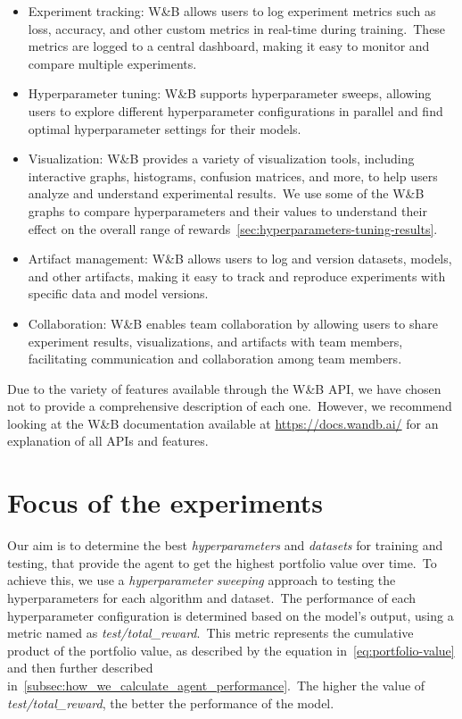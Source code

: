 \documentclass[../xlapes02]{subfiles}
\begin{document}
    \begin{itemize}
        \item Experiment tracking: W\&B allows users to log experiment metrics such as loss, accuracy, and other custom metrics in real-time during training.\ These metrics are logged to a central dashboard, making it easy to monitor and compare multiple experiments.
        \item Hyperparameter tuning: W\&B supports hyperparameter sweeps, allowing users to explore different hyperparameter configurations in parallel and find optimal hyperparameter settings for their models.
        \item Visualization: W\&B provides a variety of visualization tools, including interactive graphs, histograms, confusion matrices, and more, to help users analyze and understand experimental results.\ We use some of the W\&B graphs to compare hyperparameters and their values to understand their effect on the overall range of rewards~\cref{sec:hyperparameters-tuning-results}.
        \item Artifact management: W\&B allows users to log and version datasets, models, and other artifacts, making it easy to track and reproduce experiments with specific data and model versions.
        \item Collaboration: W\&B enables team collaboration by allowing users to share experiment results, visualizations, and artifacts with team members, facilitating communication and collaboration among team members.
    \end{itemize}

    Due to the variety of features available through the W\&B API, we have chosen not to provide a comprehensive description of each one.\ However, we recommend looking at the W\&B documentation available at \url{https://docs.wandb.ai/} for an explanation of all APIs and features.


    \section{Focus of the experiments}\label{sec:focus-of-the-experiments}
    Our aim is to determine the best \emph{hyperparameters} and \emph{datasets} for training and testing, that provide the agent to get the highest portfolio value over time.\ To achieve this, we use a \emph{hyperparameter sweeping} approach to testing the hyperparameters for each algorithm and dataset.\ The performance of each hyperparameter configuration is determined based on the model's output, using a metric named as \emph{test/total\_reward}.\ This metric represents the cumulative product of the portfolio value, as described by the equation in~\cref{eq:portfolio-value} and then further described in~\cref{subsec:how_we_calculate_agent_performance}.\ The higher the value of \emph{test/total\_reward}, the better the performance of the model.
\end{document}
